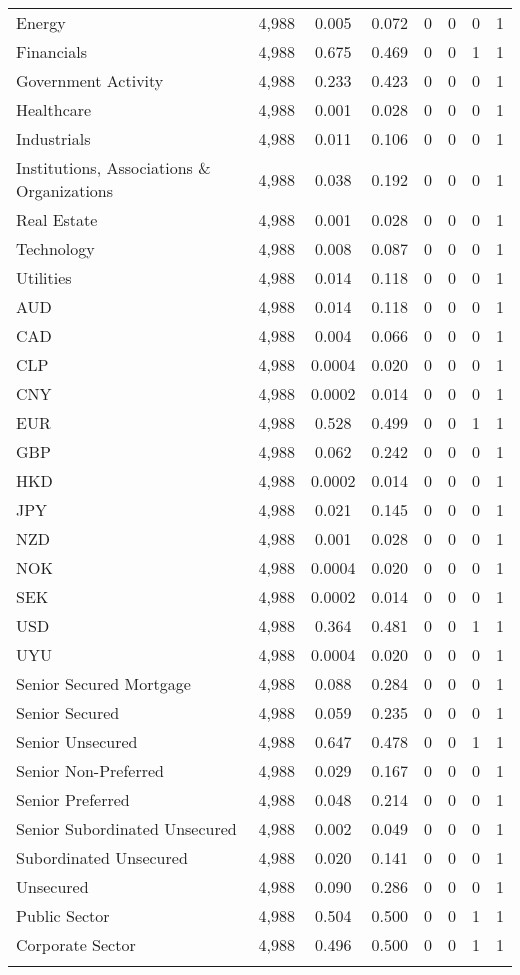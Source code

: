 \begin{table}[!ht]
\begin{tabular}{@{\extracolsep{5pt}}lccccccc}
Energy & 4,988 & 0.005 & 0.072 & 0 & 0 & 0 & 1 \\ 
Financials & 4,988 & 0.675 & 0.469 & 0 & 0 & 1 & 1 \\ 
Government Activity & 4,988 & 0.233 & 0.423 & 0 & 0 & 0 & 1 \\ 
Healthcare & 4,988 & 0.001 & 0.028 & 0 & 0 & 0 & 1 \\ 
Industrials & 4,988 & 0.011 & 0.106 & 0 & 0 & 0 & 1 \\ 
Institutions, Associations \& Organizations & 4,988 & 0.038 & 0.192 & 0 & 0 & 0 & 1 \\ 
Real Estate & 4,988 & 0.001 & 0.028 & 0 & 0 & 0 & 1 \\ 
Technology & 4,988 & 0.008 & 0.087 & 0 & 0 & 0 & 1 \\ 
Utilities & 4,988 & 0.014 & 0.118 & 0 & 0 & 0 & 1 \\ 
AUD & 4,988 & 0.014 & 0.118 & 0 & 0 & 0 & 1 \\ 
CAD & 4,988 & 0.004 & 0.066 & 0 & 0 & 0 & 1 \\ 
CLP & 4,988 & 0.0004 & 0.020 & 0 & 0 & 0 & 1 \\ 
CNY & 4,988 & 0.0002 & 0.014 & 0 & 0 & 0 & 1 \\ 
EUR & 4,988 & 0.528 & 0.499 & 0 & 0 & 1 & 1 \\ 
GBP & 4,988 & 0.062 & 0.242 & 0 & 0 & 0 & 1 \\ 
HKD & 4,988 & 0.0002 & 0.014 & 0 & 0 & 0 & 1 \\ 
JPY & 4,988 & 0.021 & 0.145 & 0 & 0 & 0 & 1 \\ 
NZD & 4,988 & 0.001 & 0.028 & 0 & 0 & 0 & 1 \\ 
NOK & 4,988 & 0.0004 & 0.020 & 0 & 0 & 0 & 1 \\ 
SEK & 4,988 & 0.0002 & 0.014 & 0 & 0 & 0 & 1 \\ 
USD & 4,988 & 0.364 & 0.481 & 0 & 0 & 1 & 1 \\ 
UYU & 4,988 & 0.0004 & 0.020 & 0 & 0 & 0 & 1 \\ 
Senior Secured Mortgage & 4,988 & 0.088 & 0.284 & 0 & 0 & 0 & 1 \\ 
Senior Secured & 4,988 & 0.059 & 0.235 & 0 & 0 & 0 & 1 \\ 
Senior Unsecured & 4,988 & 0.647 & 0.478 & 0 & 0 & 1 & 1 \\ 
Senior Non-Preferred & 4,988 & 0.029 & 0.167 & 0 & 0 & 0 & 1 \\ 
Senior Preferred & 4,988 & 0.048 & 0.214 & 0 & 0 & 0 & 1 \\ 
Senior Subordinated Unsecured & 4,988 & 0.002 & 0.049 & 0 & 0 & 0 & 1 \\ 
Subordinated Unsecured & 4,988 & 0.020 & 0.141 & 0 & 0 & 0 & 1 \\ 
Unsecured & 4,988 & 0.090 & 0.286 & 0 & 0 & 0 & 1 \\ 
Public Sector & 4,988 & 0.504 & 0.500 & 0 & 0 & 1 & 1 \\ 
Corporate Sector & 4,988 & 0.496 & 0.500 & 0 & 0 & 1 & 1 \\ 
\hline \\[-1.8ex] 
\end{tabular} 
\end{table} 

